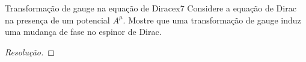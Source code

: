 \begin{exercício}{Transformação de gauge na equação de Dirac}{ex7}
    Considere a equação de Dirac na presença de um potencial \(A^\mu.\) Mostre que uma transformação de gauge induz uma mudança de fase no espinor de Dirac.
\end{exercício}
\begin{proof}[Resolução]
    
\end{proof}
